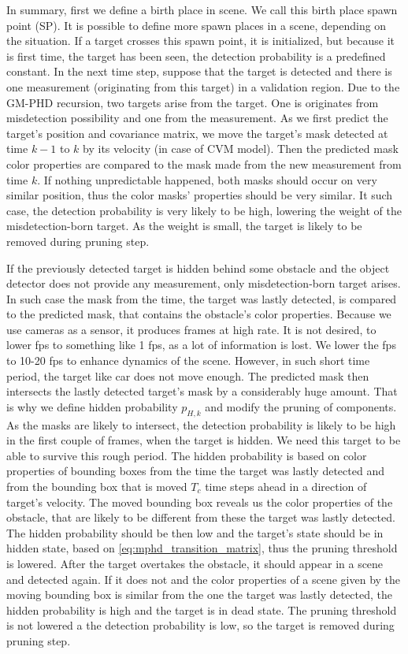In summary, first we define a birth place in scene. We call this birth place spawn point (SP). It is possible to
define more spawn places in a scene, depending on the situation. If a target crosses this spawn point, it is initialized, but because it is first time, the target has been seen, the detection probability is a predefined constant. In the
next time step, suppose that the target is detected and there is one measurement (originating from this target) in a
validation region. Due to the GM-PHD recursion, two targets arise from the target. One is originates from
misdetection possibility and one from the measurement. As we first predict the target's position and covariance
matrix, we move the target's mask detected at time $k-1$ to $k$ by its velocity (in case of CVM model). Then the
predicted mask color properties are compared to the mask made from the new measurement from time $k$. If nothing
unpredictable happened, both masks should occur on very similar position, thus the color masks' properties should be
very similar. It such case, the detection probability is very likely to be high, lowering the weight of the
misdetection-born target. As the weight is small, the target is likely to be removed during pruning step.

If the previously detected target is hidden behind some obstacle and the object detector does not provide any
measurement, only misdetection-born target arises. In such case the mask from the time, the target was lastly
detected, is compared to the predicted mask, that contains the obstacle's color properties. Because we use cameras as
a sensor, it produces frames at high rate. It is not desired, to lower fps to something like 1 fps, as a lot of
information is lost. We lower the fps to 10-20 fps to enhance dynamics of the scene. However, in such short time
period, the target like car does not move enough. The predicted mask then intersects the lastly
detected target's mask by a considerably huge amount. That is why we define hidden probability $p_{H,k}$ and modify
the pruning of components. As the masks are likely to intersect, the detection probability is likely to be high in
the first couple of frames, when the target is hidden. We need this target to be able to survive this rough period.
The hidden probability is based on color properties of bounding boxes from the time the target was lastly detected
and from the bounding box that is moved $T_c$ time steps ahead in a direction of target's velocity. The moved
bounding box reveals us the color properties of the obstacle, that are likely to be different from these the target
was lastly detected. The hidden probability should be then low and the target's state should be in hidden state,
based on \ref{eq:mphd_transition_matrix}, thus the pruning threshold is lowered. After the target overtakes the obstacle,
it should appear in a scene and detected again. If it does not and the color properties of a scene given by the moving
bounding box is similar from the one the target was lastly detected, the hidden probability is high and the target is
in dead state. The pruning threshold is not lowered a the detection probability is low, so the target is removed
during pruning step.
